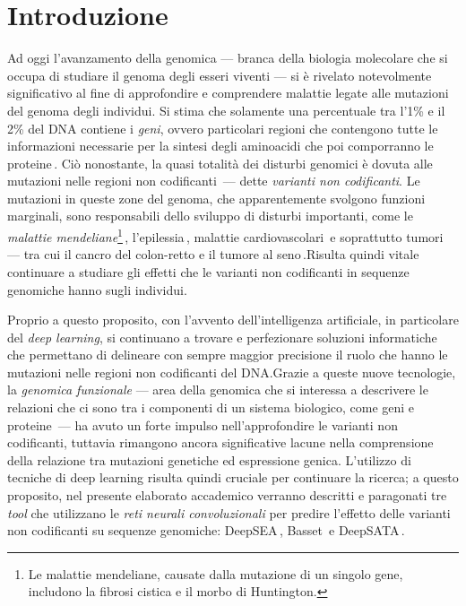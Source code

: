 
\chapter{Introduzione}\label{chp:introduction}

Ad oggi l'avanzamento della genomica — branca della biologia molecolare che si occupa di studiare il genoma degli esseri viventi — si è rivelato notevolmente significativo al fine di approfondire e comprendere malattie legate alle mutazioni del genoma degli individui. Si stima che solamente una percentuale tra l'1\% e il 2\% del DNA contiene i \textsl{geni}, ovvero particolari regioni che contengono tutte le informazioni necessarie per la sintesi degli aminoacidi che poi comporranno le proteine\,\cite{sahu2011identification, pollard2022cell}. Ciò nonostante, la quasi totalità dei disturbi genomici è dovuta alle mutazioni nelle regioni non codificanti\,\cite{zhang2015non} — dette \textsl{varianti non codificanti}. Le mutazioni in queste zone del genoma, che apparentemente svolgono funzioni marginali, sono responsabili dello sviluppo di disturbi importanti, come le \textsl{malattie mendeliane}\footnote{Le malattie mendeliane, causate dalla mutazione di un singolo gene, includono la fibrosi cistica e il morbo di Huntington.}\,\cite{french2020role, chial2008mendelian}, l'epilessia\,\cite{pagni2022non}, malattie cardiovascolari\,\cite{kapoor2014enhancer, zhang2015non} e soprattutto tumori — tra cui il cancro del colon-retto e il tumore al seno\,\cite{khurana2016role, tian2019systematic, bojesen2013multiple, michailidou2017association}.Risulta quindi vitale continuare a studiare gli effetti che le varianti non codificanti in sequenze genomiche hanno sugli individui.

Proprio a questo proposito, con l'avvento dell'intelligenza artificiale, in particolare del \textsl{deep learning}, si continuano a trovare e perfezionare soluzioni informatiche che permettano di delineare con sempre maggior precisione il ruolo che hanno le mutazioni nelle regioni non codificanti del DNA.\@ Grazie a queste nuove tecnologie, la \textsl{genomica funzionale} — area della genomica che si interessa a descrivere le relazioni che ci sono tra i componenti di un sistema biologico, come geni e proteine\,\cite{caudai2021ai} — ha avuto un forte impulso nell'approfondire le varianti non codificanti, tuttavia rimangono ancora significative lacune nella comprensione della relazione tra mutazioni genetiche ed espressione genica. L'utilizzo di tecniche di deep learning risulta quindi cruciale per continuare la ricerca; a questo proposito, nel presente elaborato accademico verranno descritti e paragonati tre \textsl{tool} che utilizzano le \textsl{reti neurali convoluzionali} per predire l'effetto delle varianti non codificanti su sequenze genomiche: DeepSEA\,\cite{zhou2015predicting}, Basset\,\cite{kelley2016basset} e DeepSATA\,\cite{ma2023deepsata}.

